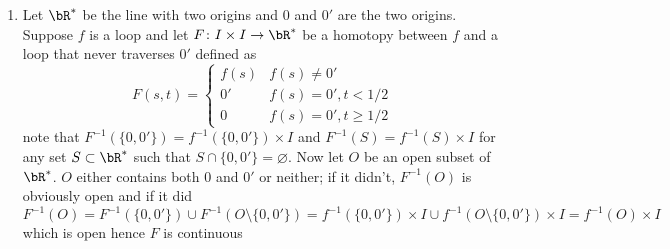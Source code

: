 \documentclass{pset}
\begin{document}
\begin{problem}
    \begin{enumerate}
        \item Let $\bR^*$ be the line with two origins and $0$ and $0'$ are the two origins. Suppose $f$ is a loop and let $F\colon I \times I \to \bR^*$ be a homotopy between $f$ and a loop that never traverses $0'$ defined as
        \[F(s, t) = 
        \begin{cases}
            f(s) & f(s) \neq 0' \\
            0' & f(s) = 0', t<1/2 \\
            0 & f(s) = 0', t\geq 1/2
        \end{cases}\]
        note that $F^{-1}(\{0, 0'\}) = f^{-1}(\{0, 0'\}) \times I$ and $F^{-1}(S) = f^{-1}(S) \times I$ for any set $S \subset \bR^*$ such that $S \cap \{0, 0'\} = \varnothing$. Now let $O$ be an open subset of $\bR^*$. $O$ either contains both $0$ and $0'$ or neither; if it didn't, $F^{-1}(O)$ is obviously open and if it did
        \[F^{-1}(O) = F^{-1}(\{0, 0'\}) \cup F^{-1}(O \setminus \{0, 0'\}) = f^{-1}(\{0, 0'\}) \times I \cup f^{-1}(O \setminus \{0, 0'\}) \times I = f^{-1}(O) \times I\]
        which is open hence $F$ is continuous
    \end{enumerate}
\end{problem}
\end{document}
